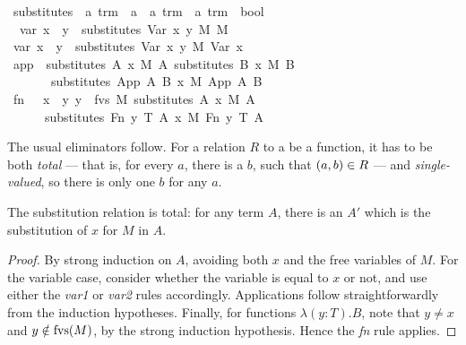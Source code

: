 \begin{implementation}
\isamarkupfalse%
\ substitutes\ {\isacharcolon}{\isacharcolon}\ {\isachardoublequoteopen}{\isacharprime}a\ trm\ {\isasymRightarrow}\ {\isacharprime}a\ {\isasymRightarrow}\ {\isacharprime}a\ trm\ {\isasymRightarrow}\ {\isacharprime}a\ trm\ {\isasymRightarrow}\ bool{\isachardoublequoteclose}\ \isanewline
\ \ var{}{\isacharcolon}\ {\isachardoublequoteopen}x\ {\isacharequal}\ y\ {\isasymLongrightarrow}\ substitutes\ {\isacharparenleft}Var\ x{\isacharparenright}\ y\ M\ M{\isachardoublequoteclose}\isanewline
{\isacharbar}\ var{}{\isacharcolon}\ {\isachardoublequoteopen}x\ {\isasymnoteq}\ y\ {\isasymLongrightarrow}\ substitutes\ {\isacharparenleft}Var\ x{\isacharparenright}\ y\ M\ {\isacharparenleft}Var\ x{\isacharparenright}{\isachardoublequoteclose}\isanewline
{\isacharbar}\ app{\isacharcolon}\ \ {\isachardoublequoteopen}{\isasymlbrakk}substitutes\ A\ x\ M\ A{\isacharprime}{\isacharsemicolon}\ substitutes\ B\ x\ M\ B{\isacharprime}{\isasymrbrakk}\isanewline
\ \ \ \ \ \ {\isasymLongrightarrow}\ substitutes\ {\isacharparenleft}App\ A\ B{\isacharparenright}\ x\ M\ {\isacharparenleft}App\ A{\isacharprime}\ B{\isacharprime}{\isacharparenright}{\isachardoublequoteclose}\isanewline
{\isacharbar}\ fn{\isacharcolon}\ \ \ {\isachardoublequoteopen}{\isasymlbrakk}x\ {\isasymnoteq}\ y{\isacharsemicolon}\ y\ {\isasymnotin}\ fvs\ M{\isacharsemicolon}\ substitutes\ A\ x\ M\ A{\isacharprime}{\isasymrbrakk}\isanewline
\ \ \ \ \ \ substitutes\ {\isacharparenleft}Fn\ y\ T\ A{\isacharparenright}\ x\ M\ {\isacharparenleft}Fn\ y\ T\ A{\isacharprime}{\isacharparenright}{\isachardoublequoteclose}\isanewline
\end{implementation}

The usual eliminators follow.
For a relation \(R\) to a be a function, it has to be both \emph{total} --- that is, for every \(a\), there is a \(b\), such that \(\left(a, b\right) \in R\) --- and \emph{single-valued}, so there is only one \(b\) for any \(a\).

\begin{lemma}
\label{lemma:substitution-total}
The substitution relation is total: for any term \(A\), there is an \(A'\) which is the substitution of \(x\) for \(M\) in \(A\).
\end{lemma}
\begin{proof}
By strong induction on \(A\), avoiding both \(x\) and the free variables of \(M\).
For the variable case, consider whether the variable is equal to \(x\) or not, and use either the \emph{var1} or \emph{var2} rules accordingly.
Applications follow straightforwardly from the induction hypotheses.
Finally, for functions \(\lambda (y:T). B\), note that \(y \neq x\) and \(y \notin \mathrm{fvs}(M)\), by the strong induction hypothesis.
Hence the \emph{fn} rule applies.
\end{proof}

